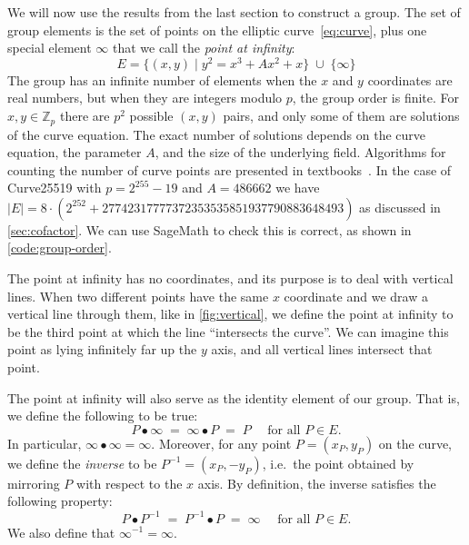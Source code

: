 \documentclass[manuscript]{acmart}
\begin{document}
We will now use the results from the last section to construct a group.
The set of group elements is the set of points on the elliptic curve~\eqref{eq:curve}, plus one special element $\infty$ that we call the \emph{point at infinity}:
\begin{equation}
E = \{(x,y) \mid y^2 = x^3 + A x^2 + x\} \;\cup\; \{\infty\}
\end{equation}
The group has an infinite number of elements when the $x$ and $y$ coordinates are real numbers, but when they are integers modulo $p$, the group order is finite.
For $x, y \in \mathbb{Z}_p$ there are $p^2$ possible $(x, y)$ pairs, and only some of them are solutions of the curve equation.
The exact number of solutions depends on the curve equation, the parameter $A$, and the size of the underlying field.
Algorithms for counting the number of curve points are presented in textbooks~\cite{Blake:1999,Cohen:2006}.
In the case of Curve25519 with $p=2^{255}-19$ and $A = 486662$ we have $|E| = 8 \cdot (2^{252} + 27742317777372353535851937790883648493)$ as discussed in \autoref{sec:cofactor}.
We can use SageMath to check this is correct, as shown in \autoref{code:group-order}.

The point at infinity has no coordinates, and its purpose is to deal with vertical lines.
When two different points have the same $x$ coordinate and we draw a vertical line through them, like in \autoref{fig:vertical}, we define the point at infinity to be the third point at which the line ``intersects the curve''.
We can imagine this point as lying infinitely far up the $y$ axis, and all vertical lines intersect that point.

The point at infinity will also serve as the identity element of our group.
That is, we define the following to be true:
\begin{equation}
P \bullet \infty \;=\; \infty \bullet P \;=\; P \quad\text{ for all } P \in E. \label{eq:law-identity}
\end{equation}
In particular, $\infty\bullet\infty=\infty$.
Moreover, for any point $P = (x_P, y_P)$ on the curve, we define the \emph{inverse} to be $P^{-1} = (x_P, -y_P)$, i.e.\ the point obtained by mirroring $P$ with respect to the $x$ axis.
By definition, the inverse satisfies the following property:
\begin{equation}
P \bullet P^{-1} \;=\; P^{-1} \bullet P \;=\; \infty \quad\text{ for all } P \in E. \label{eq:law-inverse}
\end{equation}
We also define that $\infty^{-1} = \infty$.
\end{document}
